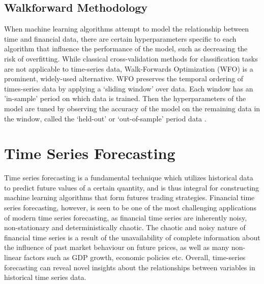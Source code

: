 \subsection{Walkforward Methodology}
When machine learning algorithms attempt to model the relationship between time and financial data, there are certain hyperparameters specific to each algorithm that influence the performance of the model, such as decreasing the risk of overfitting. While classical cross-validation methods for classification tasks are not applicable to time-series data, Walk-Forwards Optimization (WFO) is a prominent, widely-used alternative. WFO preserves the temporal ordering of times-series data by applying a `sliding window' over data. Each window has an 'in-sample' period on which data is trained.  Then the hyperparameters of the model are tuned by observing the accuracy of the model on the remaining data in the window, called the `held-out' or `out-of-sample' period data \cite{bilkon_ml}. 




\section{Time Series Forecasting}
Time series forecasting is a fundamental technique which utilizes historical data to predict future values of a certain quantity, and is thus integral for constructing machine learning algorithms that form futures trading strategies. Financial time series forecasting, however, is seen to be one of the most challenging applications of modern time series forecasting, as financial time series are inherently noisy, non-stationary and deterministically chaotic. The chaotic and noisy nature of financial time series is a result of the unavailability of complete information \cite{svm-fts} about the influence of past market behaviour on future prices, as well as many non-linear factors such as GDP growth, economic policies etc. Overall, time-series forecasting can reveal novel insights about the relationships between variables in historical time series data.

